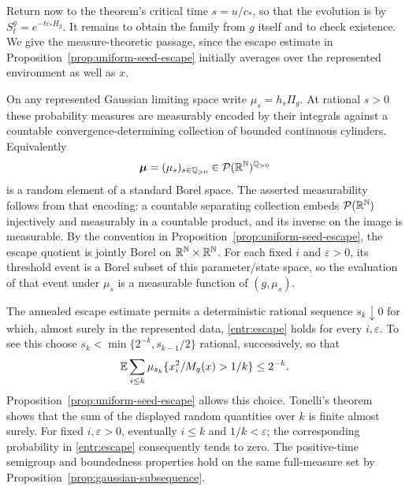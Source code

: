 Return now to the theorem's critical time \(s=u/c_*\), so that the
evolution is by \(S_t^g=e^{-t c_*H_g}\).  It remains to obtain the family from \(g\)
itself and to check existence.
We give the measure-theoretic passage, since the escape estimate in
Proposition~\ref{prop:uniform-seed-escape} initially averages over the
represented environment as well as \(x\).

On any represented Gaussian limiting space write
\(\mu_s=h_s\Pi_g\).  At rational \(s>0\) these probability measures
are measurably encoded by their integrals against a countable
convergence-determining collection of bounded continuous cylinders.
Equivalently
\[
 \boldsymbol\mu=(\mu_s)_{s\in\mathbb Q_{>0}}
      \in\mathcal P(\mathbb R^\mathbb N)^{\mathbb Q_{>0}}
\]
is a random element of a standard Borel space.  The asserted
measurability follows from that encoding: a countable separating
collection embeds \(\mathcal P(\mathbb R^\mathbb N)\) injectively and measurably
in a countable product, and its inverse on the image is measurable.
By the convention in Proposition~\ref{prop:uniform-seed-escape}, the
escape quotient is jointly Borel on \(\mathbb R^\mathbb N\times\mathbb R^\mathbb N\).
For each fixed \(i\) and \(\varepsilon>0\), its threshold event is a
Borel subset of this parameter/state space, so the evaluation of that
event under \(\mu_s\) is a measurable function of \((g,\mu_s)\).

The annealed escape estimate permits a deterministic rational sequence
\(s_k\downarrow0\) for which, almost surely in the represented data,
\eqref{entr:escape} holds for every \(i,\varepsilon\).
To see this choose \(s_k<\min\{2^{-k},s_{k-1}/2\}\) rational,
successively, so that
\[
 \mathbb E\sum_{i\le k}
  \mu_{s_k}\{x_i^2/M_g(x)>1/k\}\le2^{-k}.
\]
Proposition~\ref{prop:uniform-seed-escape} allows this choice.
Tonelli's theorem shows that the sum of the displayed random
quantities over \(k\) is finite almost surely.  For fixed
\(i,\varepsilon>0\), eventually \(i\le k\) and \(1/k<\varepsilon\);
the corresponding probability in \eqref{entr:escape} consequently
tends to zero.  The positive-time semigroup and boundedness properties
hold on the same full-measure set by
Proposition~\ref{prop:gaussian-subsequence}.

